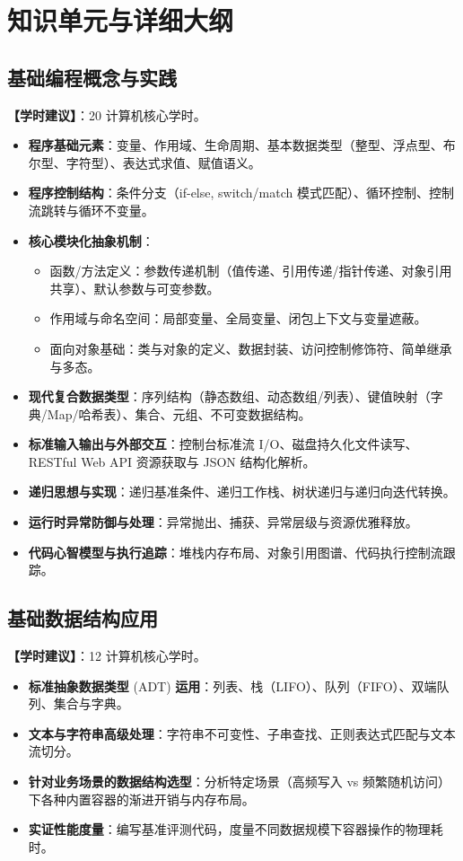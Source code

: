 \section{知识单元与详细大纲}

\subsection{基础编程概念与实践}
\textbf{【学时建议】}：20 计算机核心学时。

\begin{itemize}
    \item \textbf{程序基础元素}：变量、作用域、生命周期、基本数据类型（整型、浮点型、布尔型、字符型）、表达式求值、赋值语义。
    \item \textbf{程序控制结构}：条件分支（if-else, switch/match 模式匹配）、循环控制、控制流跳转与循环不变量。
    \item \textbf{核心模块化抽象机制}：
    \begin{itemize}
        \item 函数/方法定义：参数传递机制（值传递、引用传递/指针传递、对象引用共享）、默认参数与可变参数。
        \item 作用域与命名空间：局部变量、全局变量、闭包上下文与变量遮蔽。
        \item 面向对象基础：类与对象的定义、数据封装、访问控制修饰符、简单继承与多态。
    \end{itemize}
    \item \textbf{现代复合数据类型}：序列结构（静态数组、动态数组/列表）、键值映射（字典/Map/哈希表）、集合、元组、不可变数据结构。
    \item \textbf{标准输入输出与外部交互}：控制台标准流 I/O、磁盘持久化文件读写、RESTful Web API 资源获取与 JSON 结构化解析。
    \item \textbf{递归思想与实现}：递归基准条件、递归工作栈、树状递归与递归向迭代转换。
    \item \textbf{运行时异常防御与处理}：异常抛出、捕获、异常层级与资源优雅释放。
    \item \textbf{代码心智模型与执行追踪}：堆栈内存布局、对象引用图谱、代码执行控制流跟踪。
\end{itemize}

\subsection{基础数据结构应用}
\textbf{【学时建议】}：12 计算机核心学时。

\begin{itemize}
    \item \textbf{标准抽象数据类型} (ADT) \textbf{运用}：列表、栈（LIFO）、队列（FIFO）、双端队列、集合与字典。
    \item \textbf{文本与字符串高级处理}：字符串不可变性、子串查找、正则表达式匹配与文本流切分。
    \item \textbf{针对业务场景的数据结构选型}：分析特定场景（高频写入 vs 频繁随机访问）下各种内置容器的渐进开销与内存布局。
    \item \textbf{实证性能度量}：编写基准评测代码，度量不同数据规模下容器操作的物理耗时。
\end{itemize}

